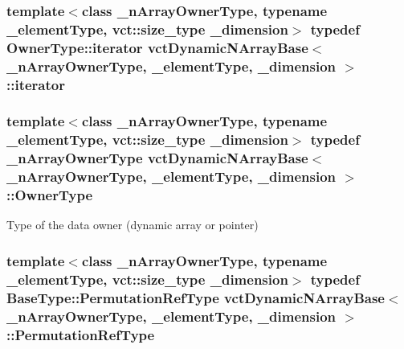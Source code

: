 \hypertarget{classvct_dynamic_n_array_base_afe6d2a8cd86a6b3a0828249b976389ba}{
\subsubsection[{iterator}]{\setlength{\rightskip}{0pt plus 5cm}template$<$class \-\_\-n\-Array\-Owner\-Type, typename \-\_\-element\-Type, vct\-::size\-\_\-type \-\_\-dimension$>$ typedef Owner\-Type\-::iterator {\bf vct\-Dynamic\-N\-Array\-Base}$<$ \-\_\-n\-Array\-Owner\-Type, \-\_\-element\-Type, \-\_\-dimension $>$\-::{\bf iterator}}}\label{classvct_dynamic_n_array_base_afe6d2a8cd86a6b3a0828249b976389ba}
\hypertarget{classvct_dynamic_n_array_base_a856048c87677204bd0338cce0e14abf6}{
\subsubsection[{Owner\-Type}]{\setlength{\rightskip}{0pt plus 5cm}template$<$class \-\_\-n\-Array\-Owner\-Type, typename \-\_\-element\-Type, vct\-::size\-\_\-type \-\_\-dimension$>$ typedef \-\_\-n\-Array\-Owner\-Type {\bf vct\-Dynamic\-N\-Array\-Base}$<$ \-\_\-n\-Array\-Owner\-Type, \-\_\-element\-Type, \-\_\-dimension $>$\-::{\bf Owner\-Type}}}\label{classvct_dynamic_n_array_base_a856048c87677204bd0338cce0e14abf6}
Type of the data owner (dynamic array or pointer) \hypertarget{classvct_dynamic_n_array_base_a32a4177a0764b9b796ed4c41fbd8c2ad}{
\subsubsection[{Permutation\-Ref\-Type}]{\setlength{\rightskip}{0pt plus 5cm}template$<$class \-\_\-n\-Array\-Owner\-Type, typename \-\_\-element\-Type, vct\-::size\-\_\-type \-\_\-dimension$>$ typedef {\bf Base\-Type\-::\-Permutation\-Ref\-Type} {\bf vct\-Dynamic\-N\-Array\-Base}$<$ \-\_\-n\-Array\-Owner\-Type, \-\_\-element\-Type, \-\_\-dimension $>$\-::{\bf Permutation\-Ref\-Type}}}\label{classvct_dynamic_n_array_base_a32a4177a0764b9b796ed4c41fbd8c2ad}
